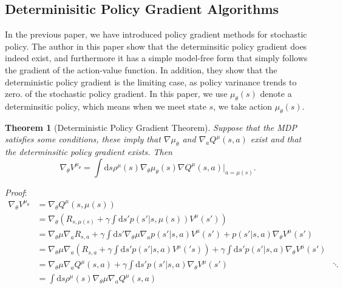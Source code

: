 \documentclass[11pt,a4paper]{article}
\def\d{{\mathrm d}}
\newtheorem{theorem}{Theorem}[subsection]
\begin{document}
\subsection{Determinisitic Policy Gradient Algorithms}
In the previous paper, we have introduced policy gradient methods for stochastic policy. The author in this paper\cite{silver2014deterministic} show that the determinsitic policy gradient does indeed exist, and furthermore it has a simple model-free form that simply follows the gradient of the action-value function. In addition, they show that the deterministic policy gradient is the limiting case, as policy varinance trends to zero. of the stochastic policy gradient. In this paper, we use $\mu_{\theta}(s)$ denote a determinsitic policy, which means when we meet state $s$, we take action $\mu_{\theta}(s)$.
\begin{theorem}[Deterministic Policy Gradient Theorem]
Suppose that the MDP satisfies some conditions, these imply that $\nabla \mu_{\theta}$ and $\nabla_a Q^{\mu}(s,a)$ exist and that the determinsitic policy gradient exists. Then
\begin{equation}
\nabla_{\theta}V^{\mu_{\theta}} = \int \d s \rho^{\mu}(s)\nabla_{\theta}\mu_{\theta}(s)\nabla Q^{\mu}(s,a)|_{a=\mu(s)}.
\end{equation}
\end{theorem}
\emph{Proof}:
\begin{align}
\nabla_{\theta}V^{\mu_{\theta}} & = \nabla_{\theta}Q^{\mu}(s,\mu(s)) \\ 
& = \nabla_{\theta}\left(R_{s,\mu(s)}+\gamma \int \d s' p(s'|s,\mu(s))V^{\mu}(s')\right) \\ 
& = \nabla_{\theta}\mu\nabla_a R_{s,a}+\gamma \int \d s'\nabla_{\theta}\mu\nabla_a p(s'|s,a)V^{\mu}(s')+p(s'|s,a)\nabla_{\theta}V^{\mu}(s') \\ 
& = \nabla_{\theta}\mu \nabla_a \left(R_{s,a}+\gamma \int \d s'p(s'|s,a)V^{\mu}('s)\right) + \gamma \int \d s' p(s'|s,a)\nabla_{\theta}V^{\mu}(s') \\
& = \nabla_\theta \mu \nabla_a Q^{\mu}(s,a) +  \gamma \int \d s' p(s'|s,a)\nabla_{\theta}V^{\mu}(s') 
& \ddots \\ 
& = \int \d s \rho^{\mu}(s)\nabla_{\theta}\mu \nabla_a Q^{\mu}(s,a)
\end{align}
\end{document}
